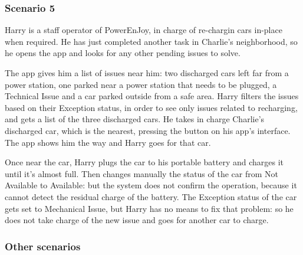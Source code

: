 \documentclass[11pt]{article} %
\newcommand{\pecomma}{PowerEnJoy, }
\begin{document}
\subsubsection{Scenario 5}
Harry is a staff operator of \pecomma in charge of re-chargin cars in-place when required. He has just completed another task in Charlie's neighborhood, so he opens the app and looks for any other pending issues to solve.

The app gives him a list of issues near him: two discharged cars left far from a power station, one parked near a power station that needs to be plugged, a Technical Issue and a car parked outside from a safe area. Harry filters the issues based on their Exception status, in order to see only issues related to recharging, and gets a list of the three discharged cars. He takes in charge Charlie's discharged car, which is the nearest, pressing the button on his app's interface. The app shows him the way and Harry goes for that car.

Once near the car, Harry plugs the car to his portable battery and charges it until it's almost full. Then changes manually the status of the car from Not Available to Available: but the system does not confirm the operation, because it cannot detect the residual charge of the battery. The Exception status of the car gets set to Mechanical Issue, but Harry has no means to fix that problem: so he does not take charge of the new issue and goes for another car to charge.


\subsubsection{Other scenarios}
\end{document}
